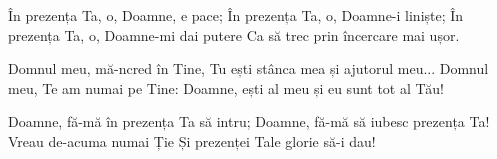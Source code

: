 \beginverse
În prezența Ta, o, Doamne, e pace;
În prezența Ta, o, Doamne-i liniște;
În prezența Ta, o, Doamne-mi dai putere
Ca să trec prin încercare mai ușor.
\endverse

\beginchorus
Domnul meu, mă-ncred în Tine,
Tu ești stânca mea și ajutorul meu...
Domnul meu, Te am numai pe Tine:
Doamne, ești al meu și eu sunt tot al Tău!
\endchorus

\beginverse
Doamne, fă-mă în prezența Ta să intru;
Doamne, fă-mă să iubesc prezența Ta!
Vreau de-acuma numai Ție
Și prezenței Tale glorie să-i dau!
\endverse
\endsong